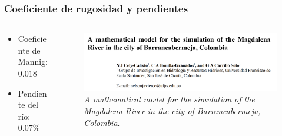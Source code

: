 \documentclass[17pt, t, lualatex]{beamer}
\begin{document}
\begin{frame}
  \frametitle{Coeficiente de rugosidad y pendientes}

  \begin{columns}
    \begin{column}{.3\textwidth}
      \begin{itemize}
        \item Coeficiente de Mannig: $0.018$
        \item Pendiente del río: $0.07\%$
      \end{itemize}
    \end{column}

    \begin{column}{.7\textwidth}
      \begin{figure}[ht]
        \centering
        \includegraphics[width=1\textwidth]{img/Paper.png}
        \caption{\textit{A mathematical model for the simulation of the Magdalena River in the city of Barrancabermeja, Colombia}\cite{garcia2020mathematical}.}
      \end{figure}
    \end{column}
  \end{columns}

\end{frame}
\end{document}
